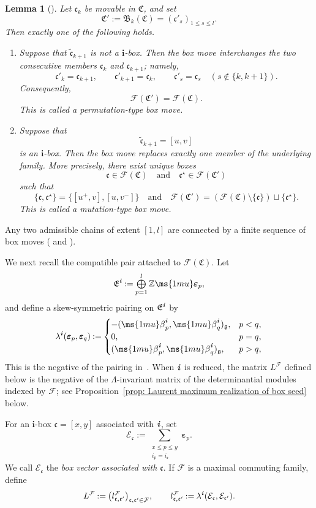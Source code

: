 \documentclass[12pt, leqno]{amsart}
\numberwithin{equation}{section}
\theoremstyle{plain}
\newtheorem{lemma}{Lemma}[section]
\theoremstyle{definition}
\newcommand{\seteq}{\mathbin{:=}}
\newcommand{\soplus}{\mathop{\mbox{\normalsize$\bigoplus$}}\limits}
\newcommand{\g}{\mathfrak{g}}
\newcommand{\Z}{\mathbb{Z}\ms{1mu}}
\newcommand{\be}{{\ms{1mu}\beta}}
\newcommand{\ve}{\boldsymbol{\varepsilon}}
\newcommand{\ii}{ \textbf{\textit{i}}}
\newcommand{\frakB}{\mathfrak{B}}
\newcommand{\frakC}{\mathfrak{C}}
\newcommand{\frakE}{\mathfrak{E}}
\newcommand{\frakc}{\mathfrak{c}}
\newcommand{\tfrakc}{\widetilde{\frakc}}
\newcommand{\bfi}{\mathbf{i}}
\newcommand{\calE}{\mathcal{E}}
\newcommand{\calF}{\mathcal{F}}
\newcommand{\qtq}[1][{and}]{\quad\text{{#1}}\quad}
\newcommand{\ee}{\end{enumerate}}
\newcommand{\bnum}{\begin{enumerate}[{\rm (i)}]}
\begin{document}
\begin{lemma}[{\cite{KKOP24A,KK24}}]
\label{lem: two types of box moves}
Let \(\frakc_k\) be movable in \(\frakC\), and set
\[
\frakC' \seteq \frakB_k(\frakC) = (\frakc'_s)_{1\leq s\leq l}.
\]
Then exactly one of the following holds.
\bnum
\item Suppose that \(\tfrakc_{k+1}\) is not a
\(\bfi\)-box.  Then the box move interchanges the two consecutive
members \(\frakc_k\) and \(\frakc_{k+1}\); namely,
\[
\frakc'_k=\frakc_{k+1}, \qquad \frakc'_{k+1}=\frakc_k, \qquad \frakc'_s=\frakc_s \quad(s\notin\{k,k+1\}).
\]
Consequently,
\[
\calF(\frakC')=\calF(\frakC).
\]
This is called a \emph{permutation-type box move}.

\item Suppose that
\[
\tfrakc_{k+1}=[u,v]
\]
is an \(\bfi\)-box.  Then the box move replaces exactly one member of
the underlying family.  More precisely, there exist unique boxes
\[
\frakc\in\calF(\frakC) \qtq \frakc^\star\in\calF(\frakC')
\]
such that
\[
\{\frakc,\frakc^\star\} = \{[u^+,v],[u,v^-]\}
\qtq
\calF(\frakC') = \left( \calF(\frakC)\setminus\{\frakc\} \right) \sqcup\{\frakc^\star\}.
\]
This is called a \emph{mutation-type box move}.
\ee
\end{lemma}


Any two admissible chains of extent \([1,l]\) are connected
by a finite sequence of box moves (\cite[Lemma~5.10]{KKOP24A} and
\cite[Proposition~2.6]{KK24}).


We next recall the compatible pair attached to \(\calF(\frakC)\).
Let
\[
\frakE^\ii \seteq \soplus_{p=1}^l\Z\ve_p,
\]
and define a skew-symmetric pairing on \(\frakE^\ii\) by
\[
\lambda^\ii(\ve_p,\ve_q) \seteq 
\begin{cases}
-(\be_p^\ii,\be_q^\ii)_\g,&p<q,\\
0,&p=q,\\
(\be_p^\ii,\be_q^\ii)_\g,&p>q,
\end{cases}
\]
This is the negative of the pairing in~\cite[(5.4)]{KKOP23F}.
When \(\ii\) is reduced, the matrix \(L^\calF\) defined below is the
negative of the \(\Lambda\)-invariant matrix of the determinantial
modules indexed by \(\calF\); see Proposition~\ref{prop: Laurent maximum realization of box seed} below.


 

For an \(\bfi\)-box \(\frakc=[x,y]\) associated with \(\ii\), set
\[
\calE_\frakc
\seteq
\sum_{\substack{x\leq p\leq y\\i_p=i_\frakc}}\ve_p.
\]
We call $\calE_\frakc$ the \emph{box vector associated with $\frakc$}.  If \(\calF\) is a maximal commuting family, define
\[
L^\calF \seteq \bigl(l_{\frakc,\frakc'}^\calF\bigr)_{\frakc,\frakc'\in\calF},
\qquad
l_{\frakc,\frakc'}^\calF \seteq \lambda^\ii(\calE_\frakc,\calE_{\frakc'}).
\]
\end{document}
